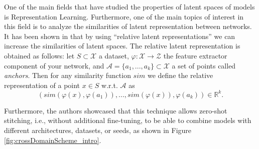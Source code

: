 \documentclass[../main.tex]{subfiles}
\begin{document}
One of the main fields that have studied the properties of latent spaces of  models is Representation Learning. Furthermore, one of the main topics of interest in this field is to analyze the similarities of latent representation between networks. It has been shown in \cite{moschella_relative_2022} that by using ``relative latent representations'' we can increase the similarities of latent spaces. The relative latent representation is obtained as follows: let $S\subset\mathcal{X}$ a dataset, $\varphi: \mathcal{X} \to \mathcal{Z}$ the feature extractor component of your network, and $\mathcal{A}=\{a_1, ..., a_k\}\subset\mathcal{X}$ a set of points called \emph{anchors}. Then for any similarity function $sim$ we define the relative representation of a point $x\in S$  w.r.t. $\mathcal{A}$ as
\[
(sim(\varphi(x), \varphi(a_1)), ..., sim(\varphi(x)), \varphi(a_k))\in \mathbb{R}^k.
\]

Furthermore, the authors showcased that this technique allows zero-shot stitching, i.e., without additional fine-tuning, to be able to combine models with different architectures, datasets, or seeds, as shown in Figure \ref{fig:crossDomainScheme_intro}.\\
\end{document}
